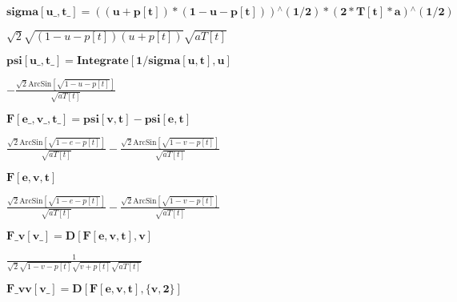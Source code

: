 \documentclass{article}
\begin{document}
\begin{doublespace}
\noindent\(\pmb{\text{sigma}[\text{u$\_$},\text{t$\_$}] = ((u+p[t])*(1-u-p[t])){}^{\wedge}(1/2)*(2*T[t]*a){}^{\wedge}(1/2)}\)
\end{doublespace}

\begin{doublespace}
\noindent\(\sqrt{2} \sqrt{(1-u-p[t]) (u+p[t])} \sqrt{a T[t]}\)
\end{doublespace}

\begin{doublespace}
\noindent\(\pmb{\text{psi}[\text{u$\_$},\text{t$\_$}] = \text{Integrate}[1/\text{sigma}[u,t],u]}\)
\end{doublespace}

\begin{doublespace}
\noindent\(-\frac{\sqrt{2} \text{ArcSin}\left[\sqrt{1-u-p[t]}\right]}{\sqrt{a T[t]}}\)
\end{doublespace}

\begin{doublespace}
\noindent\(\pmb{F[\text{e$\_$},\text{v$\_$},\text{t$\_$}] = \text{psi}[v,t]-\text{psi}[e,t]}\)
\end{doublespace}

\begin{doublespace}
\noindent\(\frac{\sqrt{2} \text{ArcSin}\left[\sqrt{1-e-p[t]}\right]}{\sqrt{a T[t]}}-\frac{\sqrt{2} \text{ArcSin}\left[\sqrt{1-v-p[t]}\right]}{\sqrt{a
T[t]}}\)
\end{doublespace}

\begin{doublespace}
\noindent\(\pmb{F[e,v,t]}\)
\end{doublespace}

\begin{doublespace}
\noindent\(\frac{\sqrt{2} \text{ArcSin}\left[\sqrt{1-e-p[t]}\right]}{\sqrt{a T[t]}}-\frac{\sqrt{2} \text{ArcSin}\left[\sqrt{1-v-p[t]}\right]}{\sqrt{a
T[t]}}\)
\end{doublespace}

\begin{doublespace}
\noindent\(\pmb{\text{F$\_$v}[\text{v$\_$}]= D[F[e,v,t],v]}\)
\end{doublespace}

\begin{doublespace}
\noindent\(\frac{1}{\sqrt{2} \sqrt{1-v-p[t]} \sqrt{v+p[t]} \sqrt{a T[t]}}\)
\end{doublespace}

\begin{doublespace}
\noindent\(\pmb{\text{F$\_$vv}[\text{v$\_$}]= D[F[e,v,t],\{v,2\}]}\)
\end{doublespace}
\end{document}

